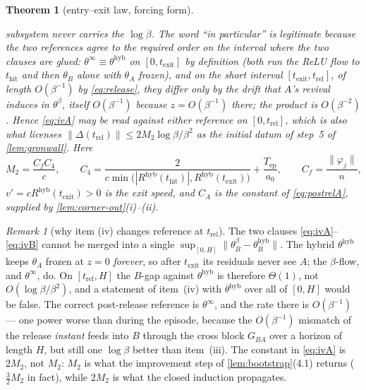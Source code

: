 \documentclass[11pt]{article}
\newtheorem{theorem}{Theorem}
\theoremstyle{definition}
\theoremstyle{remark}
\newtheorem{remark}{Remark}
\newcommand{\hyb}{\mathrm{hyb}}
\newcommand{\thit}{t_{\mathrm{hit}}}
\newcommand{\texit}{t_{\mathrm{exit}}}
\newcommand{\trel}{t_{\mathrm{rel}}}
\newcommand{\Tep}{T_{\mathrm{ep}}}
\begin{document}
\begin{theorem}[entry--exit law, forcing form]
\begin{enumerate}
subsystem never carries the $\log\beta$. The word ``in particular'' is
legitimate because the two references agree to the required order on the interval
where the two clauses are glued: $\theta^\infty\equiv\theta^{\hyb}$ on
$[0,\texit]$ \emph{by definition} (both run the ReLU flow to $\thit$ and then
$\theta_B$ alone with $\theta_A$ frozen), and on the short interval
$[\texit,\trel]$, of length $O(\beta^{-1})$ by \eqref{eq:release}, they differ
only by the drift that $A$'s revival induces in $\theta^\beta$, itself $O(\beta^{-1})$
because $z=O(\beta^{-1})$ there; the product is $O(\beta^{-2})$. Hence
\eqref{eq:ivA} may be read against either reference on $[0,\trel]$, which is also
what licenses $\|\Delta(\trel)\|\le2M_2\log\beta/\beta^2$ as the initial datum of
step~5 of \cref{lem:gronwall}. Here
\begin{equation}\label{eq:M2}
M_2=\frac{C_fC_4}{c},
\qquad
C_4=\frac{2}{c\min\bigl(|R^{\hyb}(\thit)|,R^{\hyb}(\texit)\bigr)}+\frac{\Tep}{a_0},
\qquad
C_f=\frac{\|\varphi_j\|}{n},
\end{equation}
$v'=cR^{\hyb}(\texit)>0$ is the exit speed, and $C_A$ is the constant of
\eqref{eq:postrelA}, supplied by \cref{lem:corner-out}(i)--(ii).
\end{enumerate}
\end{theorem}

\begin{remark}[why item (iv) changes reference at $\trel$]\label{rem:ivref}
The two clauses \eqref{eq:ivA}--\eqref{eq:ivB} cannot be merged into a single
$\sup_{[0,H]}\|\theta_B^\beta-\theta_B^{\hyb}\|$. The hybrid $\theta^{\hyb}$
keeps $\theta_A$ frozen at $z=0$ \emph{forever}, so after $\texit$ its residuals
never see $A$; the $\beta$-flow, and $\theta^\infty$, do. On $[\trel,H]$ the
$B$-gap against $\theta^{\hyb}$ is therefore $\Theta(1)$, not $O(\log\beta/\beta^2)$,
and a statement of item~(iv) with $\theta^{\hyb}$ over all of $[0,H]$ would be
false. The correct post-release reference is $\theta^\infty$, and the rate there
is $O(\beta^{-1})$ --- one power worse than during the episode, because the
$O(\beta^{-1})$ mismatch of the release \emph{instant} feeds into $B$ through the
cross block $G_{BA}$ over a horizon of length $H$, but still one $\log\beta$
better than item~(iii). The constant in \eqref{eq:ivA} is $2M_2$, not $M_2$:
$M_2$ is what the improvement step of \cref{lem:bootstrap}(4.1) returns
($\tfrac32M_2$ in fact), while $2M_2$ is what the closed induction propagates.
\end{remark}
\end{document}
